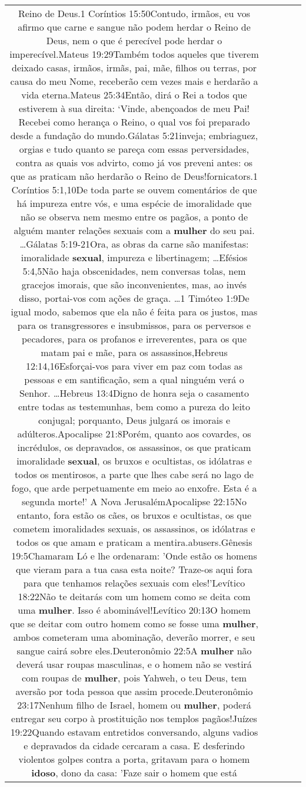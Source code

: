 \documentclass[11pt]{article}
\newlength\mylength
\begin{document}
\begin{center}
\begin{longtable}{|C{.65\mylength}|C{.30\mylength}|C{.12\mylength}|C{.12\mylength}|C{.12\mylength}|}
Reino de Deus.1 Coríntios 15:50Contudo, irmãos, eu vos afirmo que carne e sangue não podem herdar o Reino de Deus, nem o que é perecível pode herdar o imperecível.Mateus 19:29Também todos aqueles que tiverem deixado casas, irmãos, irmãs, pai, mãe, filhos ou terras, por causa do meu Nome, receberão cem vezes mais e herdarão a vida eterna.Mateus 25:34Então, dirá o Rei a todos que estiverem à sua direita: ‘Vinde, abençoados de meu Pai! Recebei como herança o Reino, o qual vos foi preparado desde a fundação do mundo.Gálatas 5:21inveja; embriaguez, orgias e tudo quanto se pareça com essas perversidades, contra as quais vos advirto, como já vos preveni antes: os que as praticam não herdarão o Reino de Deus!fornicators.1 Coríntios 5:1,10De toda parte se ouvem comentários de que há impureza entre vós, e uma espécie de imoralidade que não se observa nem mesmo entre os pagãos, a ponto de alguém manter relações sexuais com a \textbf{mulher} do seu pai. …Gálatas 5:19-21Ora, as obras da carne são manifestas: imoralidade \textbf{sexual}, impureza e libertinagem; …Efésios 5:4,5Não haja obscenidades, nem conversas tolas, nem gracejos imorais, que são inconvenientes, mas, ao invés disso, portai-vos com ações de graça. …1 Timóteo 1:9De igual modo, sabemos que ela não é feita para os justos, mas para os transgressores e insubmissos, para os perversos e pecadores, para os profanos e irreverentes, para os que matam pai e mãe, para os assassinos,Hebreus 12:14,16Esforçai-vos para viver em paz com todas as pessoas e em santificação, sem a qual ninguém verá o Senhor. …Hebreus 13:4Digno de honra seja o casamento entre todas as testemunhas, bem como a pureza do leito conjugal; porquanto, Deus julgará os imorais e adúlteros.Apocalipse 21:8Porém, quanto aos covardes, os incrédulos, os depravados, os assassinos, os que praticam imoralidade \textbf{sexual}, os bruxos e ocultistas, os idólatras e todos os mentirosos, a parte que lhes cabe será no lago de fogo, que arde perpetuamente em meio ao enxofre. Esta é a segunda morte!' A Nova JerusalémApocalipse 22:15No entanto, fora estão os cães, os bruxos e ocultistas, os que cometem imoralidades sexuais, os assassinos, os idólatras e todos os que amam e praticam a mentira.abusers.Gênesis 19:5Chamaram Ló e lhe ordenaram: 'Onde estão os homens que vieram para a tua casa esta noite? Traze-os aqui fora para que tenhamos relações sexuais com eles!'Levítico 18:22Não te deitarás com um homem como se deita com uma \textbf{mulher}. Isso é abominável!Levítico 20:13O homem que se deitar com outro homem como se fosse uma \textbf{mulher}, ambos cometeram uma abominação, deverão morrer, e seu sangue cairá sobre eles.Deuteronômio 22:5A \textbf{mulher} não deverá usar roupas masculinas, e o homem não se vestirá com roupas de \textbf{mulher}, pois Yahweh, o teu Deus, tem aversão por toda pessoa que assim procede.Deuteronômio 23:17Nenhum filho de Israel, homem ou \textbf{mulher}, poderá entregar seu corpo à prostituição nos templos pagãos!Juízes 19:22Quando estavam entretidos conversando, alguns vadios e depravados da cidade cercaram a casa. E desferindo violentos golpes contra a porta, gritavam para o homem \textbf{idoso}, dono da casa: 'Faze sair o homem que está 
\end{longtable}
\end{center}
\end{document}
